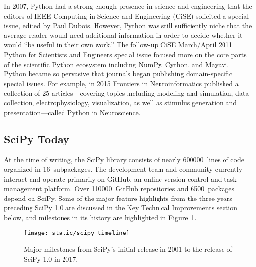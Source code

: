 \documentclass[fleqn,10pt]{wlscirep}
\begin{document}
In 2007, Python had a strong enough presence in science and engineering
that the editors of IEEE Computing in Science and Engineering
(CiSE) solicited a special issue\cite{dubois2007guest}, edited by Paul
Dubois. However, Python was still sufficiently niche that the average reader
would need additional information in order to decide whether it would
``be useful in their own work.''
The follow-up CiSE March/April 2011 Python for Scientists and Engineers
special issue\cite{millman2011python} focused more on the core parts
of the scientific Python ecosystem\cite{perez2011python} including
NumPy\cite{vanderwalt2011numpy}, Cython\cite{behnel2011cython},
and Mayavi\cite{ramachandran2011mayavi}. Python became so pervasive that
journals began publishing domain-specific special issues.
For example, in 2015 Frontiers in Neuroinformatics published a collection of 25 articles---covering
topics including modeling and simulation, data collection, electrophysiology, visualization,
as well as stimulus generation and presentation---called Python in
Neuroscience\cite{python-FIN}.

\subsection*{SciPy Today}
At the time of writing, the SciPy library consists of nearly
\num{600000}~lines of code organized in 16~subpackages. The development
team and community currently interact and operate primarily
on GitHub, an online version control and task management platform.
Over \num{110000}~GitHub repositories and \num{6500}~packages depend
on SciPy\cite{dependents}. Some of the major
feature highlights from the three years preceding
SciPy 1.0 are discussed in the Key Technical Improvements section below,
and milestones in its history are highlighted in Figure~\ref{fig:timeline}.

\begin{figure}[H]
\centering
\texttt{[image: static/scipy\_timeline]}
\caption{Major milestones from SciPy's initial release in 2001 to
the release of SciPy 1.0 in 2017.}
\label{fig:timeline}
\end{figure}

\end{document}
